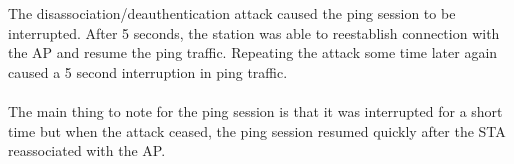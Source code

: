 The disassociation/deauthentication attack caused the ping session to be interrupted. After 5 seconds, the station was able to reestablish connection with the AP and resume the ping traffic.
Repeating the attack some time later again caused a  5 second interruption in ping traffic.  \\ \\
The main thing to note for the ping session is that it was interrupted for a short time but when the attack ceased, the ping session resumed quickly after the STA reassociated with the AP.
